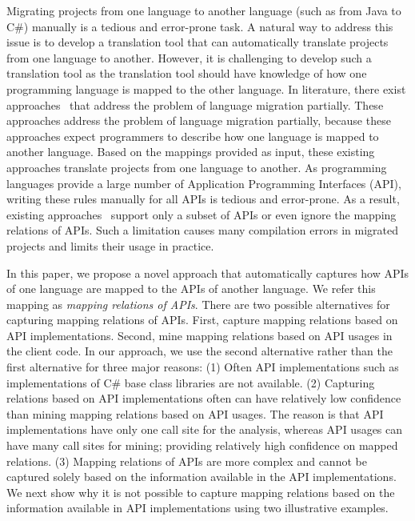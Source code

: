 Migrating projects from one language to another language (such as from Java to C\#) manually
is a tedious and error-prone task. A natural way to address this issue is to develop
a translation tool that can automatically translate projects from one language to another.
However, it is challenging to develop such a translation tool as the translation tool should
have knowledge of how one programming language is mapped to the other language. In literature,
there exist approaches~\cite{mossienko2003automated, yasumatsu1995spice, hainaut2008migration}
that address the problem of language migration partially. These approaches address 
the problem of language migration partially, because these approaches expect programmers
to describe how one language is mapped to another language. Based on the mappings provided
as input, these existing approaches translate projects from one language to another. 
As programming languages provide a large number of Application Programming Interfaces (API), writing these rules manually 
for all APIs is tedious and error-prone. As a result, existing
approaches~\cite{mossienko2003automated,yasumatsu1995spice,hainaut2008migration}
support only a subset of APIs or even ignore the mapping relations
of APIs. Such a limitation causes many compilation errors in migrated projects and limits their usage in practice. 

In this paper, we propose a novel approach that automatically captures
how APIs of one language are mapped to the APIs of another language. We refer this
mapping as \emph{mapping relations of APIs}. There are two possible alternatives
for capturing mapping relations of APIs. First, capture mapping relations based
on API implementations. Second, mine mapping relations based on API usages in the client code.
In our approach, we use the second alternative rather than the first alternative 
for three major reasons: (1) Often API implementations such as implementations of C\# base class 
libraries are not available. (2) Capturing relations based on API implementations
often can have relatively low confidence than mining mapping relations based on API usages.
The reason is that API implementations have only one call site for the analysis, whereas
API usages can have many call sites for mining; providing relatively high confidence on mapped
relations. (3) Mapping relations of APIs are more complex and cannot be captured solely
based on the information available in the API implementations. We next
show why it is not possible to capture mapping relations
based on the information available in API implementations using two illustrative examples.

